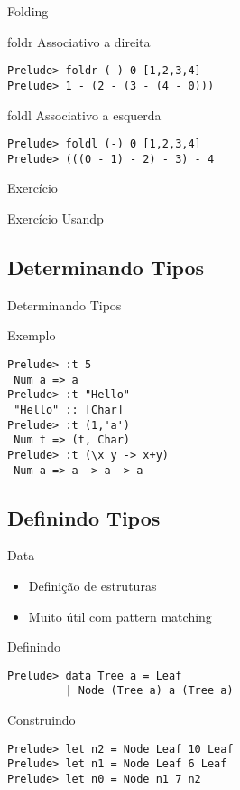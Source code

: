 \documentclass{beamer}
\begin{document}
	\begin{frame}[fragile]{Folding}
	 \begin{block}{foldr}
	  Associativo a direita
	  \begin{lstlisting}
Prelude> foldr (-) 0 [1,2,3,4]
Prelude> 1 - (2 - (3 - (4 - 0)))
	  \end{lstlisting}
	 \end{block}
	 
	 \begin{block}{foldl}
	  Associativo a esquerda
	  \begin{lstlisting}
Prelude> foldl (-) 0 [1,2,3,4]
Prelude> (((0 - 1) - 2) - 3) - 4
	  \end{lstlisting}
	 \end{block}
	\end{frame}	
	
	\begin{frame}{Exercício}
	 \begin{block}{Exercício}
	  Usandp 
	 \end{block}
	\end{frame}
	
	\subsection{Determinando Tipos}
		\begin{frame}[fragile]{Determinando Tipos}
		 \begin{block}{Exemplo}
		 \begin{lstlisting}
Prelude> :t 5
 Num a => a
Prelude> :t "Hello"
 "Hello" :: [Char]
Prelude> :t (1,'a')
 Num t => (t, Char)
Prelude> :t (\x y -> x+y)
 Num a => a -> a -> a
		 \end{lstlisting}
		 \end{block}
		\end{frame}
		
	\subsection{Definindo Tipos}
	
		\begin{frame}[fragile]{Data}
		 
		 \begin{itemize}
		  \item Definição de estruturas
		  \item Muito útil com pattern matching
		 \end{itemize}
		 
		 \begin{block}{Definindo}
		  \begin{lstlisting}
Prelude> data Tree a = Leaf 
         | Node (Tree a) a (Tree a)
		  \end{lstlisting}
		 \end{block}		 
		 \begin{block}{Construindo}
		  \begin{lstlisting}
Prelude> let n2 = Node Leaf 10 Leaf
Prelude> let n1 = Node Leaf 6 Leaf
Prelude> let n0 = Node n1 7 n2
		  \end{lstlisting}
		 \end{block}
		\end{frame}
		
\end{document}
